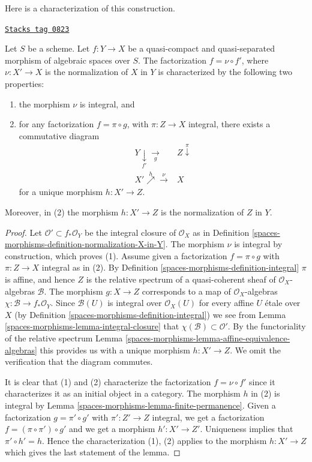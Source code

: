 Here is a characterization of this construction.

\begin{lemma}
\label{spaces-morphisms-lemma-characterize-normalization}
\href{https://stacks.math.columbia.edu/tag/0823}{\texttt{Stacks tag 0823}}

Let $S$ be a scheme. Let $f : Y \to X$ be a quasi-compact and quasi-separated
morphism of algebraic spaces over $S$. The factorization $f = \nu \circ f'$,
where $\nu : X' \to X$ is the normalization of $X$ in $Y$ is characterized
by the following two properties:
\begin{enumerate}
\item the morphism $\nu$ is integral, and
\item for any factorization $f = \pi \circ g$, with $\pi : Z \to X$
integral, there exists a commutative diagram
$$
\begin{array}{cc}Y \underset{f'}{\downarrow}\underset{g}{\longrightarrow} & Z \overset{\pi}{\downarrow} \\ X' \overset{h}{\nearrow}\overset{\nu}{\longrightarrow} & X\end{array}
$$
for a unique morphism $h : X' \to Z$.
\end{enumerate}
Moreover, in (2) the morphism $h : X' \to Z$ is the normalization of
$Z$ in $Y$.
\end{lemma}

\begin{proof}
Let $\mathcal{O}' \subset f_*\mathcal{O}_Y$ be the integral closure of
$\mathcal{O}_X$ as in Definition \ref{spaces-morphisms-definition-normalization-X-in-Y}.
The morphism $\nu$ is integral by construction, which proves (1).
Assume given a factorization $f = \pi \circ g$ with $\pi : Z \to X$
integral as in (2). By Definition \ref{spaces-morphisms-definition-integral}
$\pi$ is affine, and hence $Z$ is the relative
spectrum of a quasi-coherent sheaf of $\mathcal{O}_X$-algebras $\mathcal{B}$.
The morphism $g : X \to Z$ corresponds to a map of $\mathcal{O}_X$-algebras
$\chi : \mathcal{B} \to f_*\mathcal{O}_Y$. Since $\mathcal{B}(U)$ is
integral over $\mathcal{O}_X(U)$ for every affine $U$ \'etale over $X$
(by Definition \ref{spaces-morphisms-definition-integral})
we see from Lemma \ref{spaces-morphisms-lemma-integral-closure}
that $\chi(\mathcal{B}) \subset \mathcal{O}'$.
By the functoriality of the relative spectrum
Lemma \ref{spaces-morphisms-lemma-affine-equivalence-algebras}
this provides us with a unique morphism
$h : X' \to Z$. We omit the verification that the diagram commutes.

\medskip\noindent
It is clear that (1) and (2) characterize the
factorization $f = \nu \circ f'$ since it characterizes it
as an initial object in a category. The morphism $h$ in (2)
is integral by Lemma \ref{spaces-morphisms-lemma-finite-permanence}.
Given a factorization $g = \pi' \circ g'$ with $\pi' : Z' \to Z$
integral, we get a factorization $f = (\pi \circ \pi') \circ g'$ and
we get a morphism $h' : X' \to Z'$. Uniqueness implies that
$\pi' \circ h' = h$. Hence the characterization (1), (2) applies
to the morphism $h : X' \to Z$ which gives the last statement of the lemma.
\end{proof}


